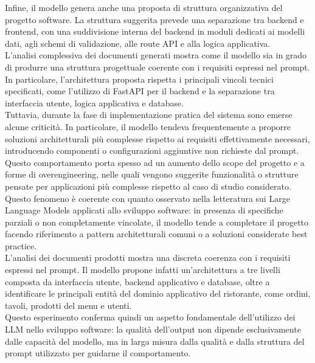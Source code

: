 Infine, il modello genera anche una proposta di struttura organizzativa del progetto software. La struttura suggerita prevede una separazione tra backend e frontend, con una suddivisione interna del backend in moduli dedicati ai modelli dati, agli schemi di validazione, alle route API e alla logica applicativa.
\\
L'analisi complessiva dei documenti generati mostra come il modello sia in grado di produrre una struttura progettuale coerente con i requisiti espressi nel prompt. In particolare, l'architettura proposta rispetta i principali vincoli tecnici specificati, come l'utilizzo di FastAPI per il backend e la separazione tra interfaccia utente, logica applicativa e database.
\\
Tuttavia, durante la fase di implementazione pratica del sistema sono emerse alcune criticità. In particolare, il modello tendeva frequentemente a proporre soluzioni architetturali più complesse rispetto ai requisiti effettivamente necessari, introducendo componenti o configurazioni aggiuntive non richieste dal prompt. Questo comportamento porta spesso ad un aumento dello scope del progetto e a forme di overengineering, nelle quali vengono suggerite funzionalità o strutture pensate per applicazioni più complesse rispetto al caso di studio considerato.
\\
Questo fenomeno è coerente con quanto osservato nella letteratura sui Large Language Models applicati allo sviluppo software: in presenza di specifiche parziali o non completamente vincolate, il modello tende a completare il progetto facendo riferimento a pattern architetturali comuni o a soluzioni considerate best practice.
\\
L'analisi dei documenti prodotti mostra una discreta coerenza con i requisiti espressi nel prompt. Il modello propone infatti un'architettura a tre livelli composta da interfaccia utente, backend applicativo e database, oltre a identificare le principali entità del dominio applicativo del ristorante, come ordini, tavoli, prodotti del menu e utenti.
\\
Questo esperimento conferma quindi un aspetto fondamentale dell'utilizzo dei LLM nello sviluppo software: la qualità dell'output non dipende esclusivamente dalle capacità del modello, ma in larga misura dalla qualità e dalla struttura del prompt utilizzato per guidarne il comportamento.
